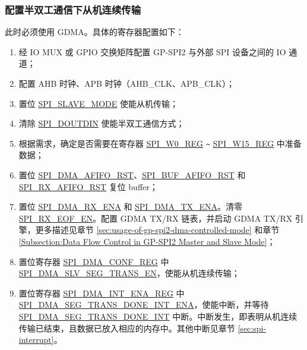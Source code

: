 \documentclass[main\_\_CN.tex]{subfiles}
\begin{document}
\subsubsection{配置半双工通信下从机连续传输}\label{sec:gp-spi2-slave-hd-seg-trans}

此时必须使用 GDMA。具体的寄存器配置如下：

\begin{enumerate}
   \item 经 IO MUX 或 GPIO 交换矩阵配置 GP-SPI2 与外部 SPI 设备之间的 IO 通道； 
   
   \item 配置 AHB 时钟、APB 时钟（AHB\_CLK、APB\_CLK）；

    \item 置位 \hyperref[fielddesc:SPISLAVEMODE]{SPI\_SLAVE\_MODE} 使能从机传输； 
    
    \item 清除 \hyperref[fielddesc:SPIDOUTDIN]{SPI\_DOUTDIN} 使能半双工通信方式；
    
    \item 根据需求，确定是否需要在寄存器 \hyperref[regdesc:SPIW0REG]{SPI\_W0\_REG} \verb+~+ \hyperref[regdesc:SPIW0REG]{SPI\_W15\_REG} 中准备数据； 
    
    \item 置位 \hyperref[fielddesc:SPIDMAAFIFORST]{SPI\_DMA\_AFIFO\_RST}、\hyperref[fielddesc:SPIBUFAFIFORST]{SPI\_BUF\_AFIFO\_RST} 和 \hyperref[fielddesc:SPIRXAFIFORST]{SPI\_RX\_AFIFO\_RST} 复位 buffer；
        
    \item 置位 \hyperref[fielddesc:SPIDMARXENA]{SPI\_DMA\_RX\_ENA} 和 \hyperref[fielddesc:SPIDMATXENA]{SPI\_DMA\_TX\_ENA}。清零 \hyperref[fielddesc:SPIRXEOFEN]{SPI\_RX\_EOF\_EN}。配置 GDMA TX/RX 链表，并启动 GDMA TX/RX 引擎，更多描述见章节 \ref{sec:usage-of-gp-spi2-dma-controlled-mode} 和章节 \ref{Subsection:Data Flow Control in GP-SPI2 Master and Slave Mode}；

    \item 置位寄存器 \hyperref[regdesc:SPIDMACONFREG]{SPI\_DMA\_CONF\_REG} 中 \hyperref[fielddesc:SPIDMASLVSEGTRANSEN]{SPI\_DMA\_SLV\_SEG\_TRANS\_EN}，使能从机连续传输；
    
    \item 置位寄存器 \hyperref[regdesc:SPIDMAINTENAREG]{SPI\_DMA\_INT\_ENA\_REG} 中 \hyperref[fielddesc:SPIDMASEGTRANSDONEINTENA]{SPI\_DMA\_SEG\_TRANS\_DONE\_INT\_ENA}，使能中断，并等待 \hyperref[int:SPIDMASEGTRANSDONEINT]{SPI\_DMA\_SEG\_TRANS\_DONE\_INT} 中断。中断发生，即表明从机连续传输已结束，且数据已放入相应的内存中。其他中断见章节 \ref{sec:spi-interrupt}。
\end{enumerate}
\end{document}
